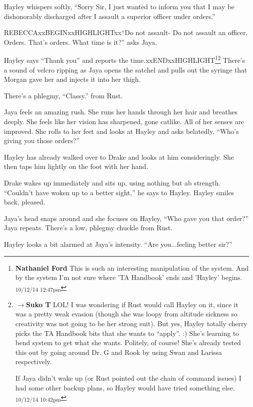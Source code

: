 Hayley whispers softly, ``Sorry Sir, I just wanted to inform you that I may be dishonorably discharged after I assault a superior officer under orders.''

REBECCAxxBEGINxxHIGHLIGHTxx``Do not assault-  Do not assault an officer.  Orders.  That's orders.  What time is it?'' asks Jaya.

Hayley says ``Thank you'' and reports the time.xxENDxxHIGHLIGHT\footnote{\textbf{Nathaniel Ford }This is such an interesting manipulation of the system. And by the system I'm not sure where 'TA Handbook' ends and 'Hayley' begins. \textsubscript{10/12/14 12:47pm}}\footnote{$\rightarrow$\textbf{Suko T }LOL!  I was wondering if Rust would call Hayley on it, since it was a pretty weak evasion (though she was loopy from altitude sickness so creativity was not going to be her strong suit).  But yes, Hayley totally cherry picks the TA Handbook bits that she wants to ``apply''. :)  She's learning to bend system to get what she wants.  Politely, of course!  She's already tested this out by going around Dr. G and Rook by using Swan and Larissa respectively.  

If Jaya didn't wake up (or Rust pointed out the chain of command issues) I had some other backup plans, so Hayley would have tried something else. \textsubscript{10/12/14 10:42pm}}  There's a sound of velcro ripping as Jaya opens the satchel and pulls out the syringe that Morgan gave her and injects it into her thigh. 

There's a phlegmy, ``Classy.'' from Rust.

Jaya feels an amazing rush.  She runs her hands through her hair and breathes deeply.  She feels like her vision has sharpened, gone catlike.  All of her senses are improved.  She rolls to her feet and looks at Hayley and asks belatedly, ``Who's giving you those orders?''

Hayley has already walked over to Drake and looks at him consideringly.  She then taps him lightly on the foot with her hand.

Drake wakes up immediately and sits up, using nothing but ab strength.  ``Couldn't have woken up to a better sight,'' he says to Hayley.  Hayley smiles back, pleased.

Jaya's head snaps around and she focuses on Hayley, ``Who gave you that order?'' Jaya repeats.  There's a low, phlegmy chuckle from Rust.

Hayley looks a bit alarmed at Jaya's intensity.  ``Are you...feeling better sir?''

